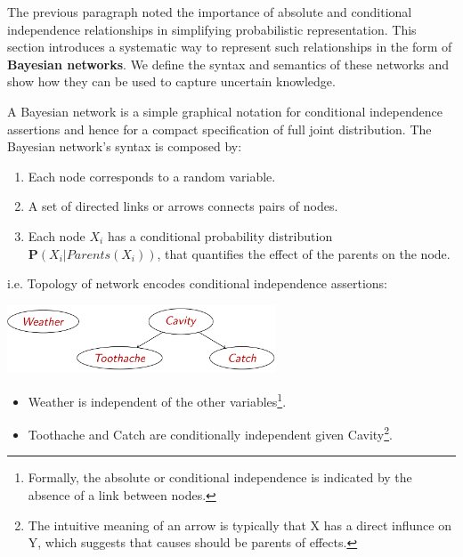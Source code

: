 The previous paragraph noted the importance of absolute and conditional independence relationships in simplifying probabilistic representation.
This section introduces a systematic way to represent such relationships in the form of \textbf{Bayesian networks}.
We define the syntax and semantics of these networks and show how they can be used to capture uncertain knowledge. \vspace{7pt}

A Bayesian network is a simple graphical notation for conditional independence assertions and hence for a compact specification of full joint distribution.
The Bayesian network's syntax is composed by:
\begin{enumerate}
    \item Each node corresponds to a random variable.
    \item A set of directed links or arrows connects pairs of nodes.
    \item Each node $X_i$ has a conditional probability distribution $\mathbf{P}(X_i|Parents(X_i))$, that quantifies the effect of the parents on the node.
\end{enumerate}
\begin{example}
    i.e. Topology of network encodes conditional independence assertions: \vspace{3.5pt}
    \begin{center}
        \includegraphics[width=0.6\textwidth]{img/img2.png}
    \end{center} \vspace{3.5pt}
    \begin{itemize}
        \renewcommand{\labelitemi}{-}
        \item Weather is independent of the other variables\footnote{Formally, the absolute or conditional independence is indicated by the absence of a link between nodes.}.
        \item Toothache and Catch are conditionally independent given Cavity\footnote{The intuitive meaning of an arrow is typically that X has a direct influnce on Y, which suggests that causes should be parents of effects.}.
    \end{itemize}
\end{example}
